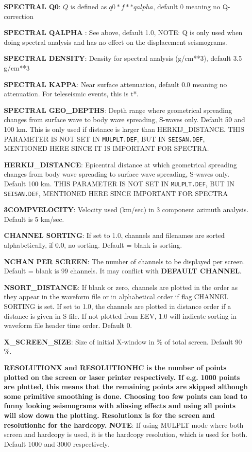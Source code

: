 \textbf{SPECTRAL Q0}:  $Q$ is defined as $q0 * f**qalpha$, default 0 meaning no Q-correction 

\textbf{SPECTRAL QALPHA }: See above, default 1.0, NOTE: Q is only used when doing spectral analysis and has no effect on the displacement seismograms. 

\textbf{SPECTRAL DENSITY}: Density for spectral analysis (g/cm**3), default 3.5 g/cm**3 

\textbf{SPECTRAL KAPPA}: Near surface attenuation, default 0.0 meaning no attenuation. For teleseismic events, this is t*. 

\textbf{SPECTRAL GEO\_DEPTHS}: Depth range where geometrical spreading changes from surface wave to body wave spreading, S-waves only. Default 50 and 100 km. This is only used if distance is larger than HERKIJ\_DISTANCE. THIS PARAMETER IS NOT SET IN \texttt{MULPLT.DEF}, BUT IN \texttt{SEISAN.DEF}, MENTIONED HERE SINCE IT IS IMPORTANT FOR SPECTRA. 

\textbf{HERKIJ\_DISTANCE}: Epicentral distance at which geometrical spreading changes from body wave spreading to surface wave spreading, S-waves only. Default 100 km.  THIS PARAMETER IS NOT SET IN \texttt{MULPLT.DEF}, BUT IN \texttt{SEISAN.DEF}, MENTIONED HERE SINCE IMPORTANT FOR SPECTRA 

\textbf{3COMPVELOCITY}: Velocity used (km/sec) in 3 component azimuth analysis. Default is 5 km/sec. 

\textbf{CHANNEL SORTING}: If set to 1.0, channels and filenames are sorted alphabetically, if 0.0, no sorting. Default = blank is sorting. 

\textbf{NCHAN PER SCREEN}: The number of channels to be displayed per screen. 
Default = blank is 99 channels. 
It may conflict with \textbf{DEFAULT CHANNEL}.

\textbf{NSORT\_DISTANCE}: If blank or zero, channels are plotted in 
the order as they appear in the waveform file 
or in alphabetical order if flag CHANNEL SORTING is set. 
If set to 1.0, the channels are plotted in 
distance order if a distance is given in S-file. 
If not plotted from EEV, 1.0 will indicate sorting in 
waveform file header time order. Default 0.

\textbf{X\_SCREEN\_SIZE}: Size of initial X-window in \% of total screen. Default 90 \%. 

\textbf{RESOLUTIONX and RESOLUTIONHC is the number of points plotted on the screen or laser printer respectively. If e.g. 1000 points are plotted, this means that the remaining points are skipped although some primitive smoothing is done. Choosing too few points can lead to funny looking seismograms with aliasing effects and using all points will slow down the plotting. Resolutionx is for the screen and resolutionhc for the hardcopy. NOTE}: If using MULPLT mode where both screen and hardcopy is used, it is the hardcopy resolution, which is used for both. Default 1000 and 3000 respectively. 


